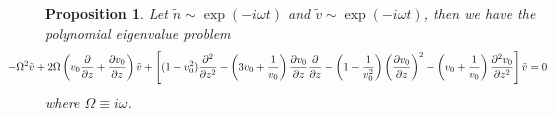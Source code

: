 \documentclass{article}
\theoremstyle{plain}
\newtheorem{proposition}{Proposition}
\theoremstyle{definition}
\theoremstyle{remark}
\theoremstyle{remark}
\begin{document}
\begin{proposition}
    Let $\tilde{n}\sim \exp(-i\omega t)$ and $\tilde{v} \sim \exp(-i\omega t)$, then we have the polynomial eigenvalue problem
    \begin{equation}
        \hspace{-0.5in}
            -\Omega^2 \tilde{v} 
            + 2\Omega\left(v_0\pdv{}{z} + \pdv{v_0}{z}\right) \tilde{v} 
            + \left[ (1-v_0^2)\pdv[2]{}{z} 
            -\left(3v_0 + \frac{1}{v_0}\right)\pdv{v_0}{z}\pdv{}{z} 
            - \left(1-\frac{1}{v_0^2}\right)\left(\pdv{v_0}{z}\right)^2 
            - \left(v_0+\frac{1}{v_0}\right)\pdv[2]{v_0}{z} \right]\tilde{v}
            = 0
            \label{eq:polynomial-eigenvalue-problem}
    \end{equation}
    where $\Omega\equiv i\omega$.
\end{proposition}
\end{document}
